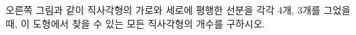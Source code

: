 \noindent\begin{minipage}[t]{0.58\linewidth}\vspace{0pt}\raggedright 오른쪽 그림과 같이 직사각형의 가로와 세로에 평행한 선분을 각각 4개, 3개를 그었을 때, 이 도형에서 찾을 수 있는 모든 직사각형의 개수를 구하시오.\end{minipage}\hfill\begin{minipage}[t]{0.4\linewidth}\vspace{0pt}\centering \resizebox{\ifdim\width>\linewidth\linewidth\else\width\fi}{!}{}\end{minipage}\par
